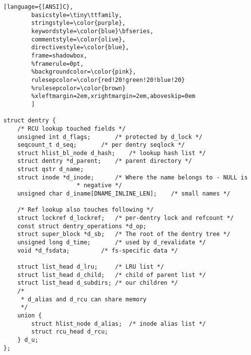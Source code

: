 \begin{lstlisting}[language={[ANSI]C},
        basicstyle=\tiny\ttfamily,
        stringstyle=\color{purple},
        keywordstyle=\color{blue}\bfseries,
        commentstyle=\color{olive},
        directivestyle=\color{blue},
        frame=shadowbox,
        %framerule=0pt,
        %backgroundcolor=\color{pink},
        rulesepcolor=\color{red!20!green!20!blue!20}
        %rulesepcolor=\color{brown}
        %xleftmargin=2em,xrightmargin=2em,aboveskip=0em
        ]

struct dentry {
	/* RCU lookup touched fields */
	unsigned int d_flags;		/* protected by d_lock */
	seqcount_t d_seq;		/* per dentry seqlock */
	struct hlist_bl_node d_hash;	/* lookup hash list */
	struct dentry *d_parent;	/* parent directory */
	struct qstr d_name;
	struct inode *d_inode;		/* Where the name belongs to - NULL is
					 * negative */
	unsigned char d_iname[DNAME_INLINE_LEN];	/* small names */

	/* Ref lookup also touches following */
	struct lockref d_lockref;	/* per-dentry lock and refcount */
	const struct dentry_operations *d_op;
	struct super_block *d_sb;	/* The root of the dentry tree */
	unsigned long d_time;		/* used by d_revalidate */
	void *d_fsdata;			/* fs-specific data */

	struct list_head d_lru;		/* LRU list */
	struct list_head d_child;	/* child of parent list */
	struct list_head d_subdirs;	/* our children */
	/*
	 * d_alias and d_rcu can share memory
	 */
	union {
		struct hlist_node d_alias;	/* inode alias list */
	 	struct rcu_head d_rcu;
	} d_u;
};


\end{lstlisting}
